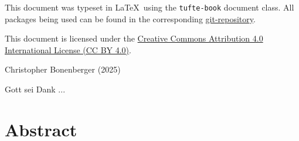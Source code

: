 \maketitle%
\setlength{\parindent}{0pt}%
\thispagestyle{empty}

This document was typeset in \LaTeX~using the \texttt{tufte-book} document class. All packages being used can be found in the corresponding  \href{https://github.com/cmab92/TeXamples/tree/master/books/main.tex}{git-repository}. \\\newline 

This document is licensed under the 
\href{https://creativecommons.org/licenses/by/4.0/}{Creative Commons Attribution 4.0 International License (CC BY 4.0)}. \\\newline 

\vfill
Christopher Bonenberger (2025) \titleofthesis \clearpage
\setlength{\parindent}{0pt}%
\thispagestyle{empty}
\vfill


\thispagestyle{empty}
\setlength{\parindent}{0pt}%
\hfill %
\begin{fullwidth}
		{\centering
			\kitschytwo\LARGE Gott sei Dank ...\par
		}
\end{fullwidth}
\setlength{\parindent}{0pt}%
\cleardoublepage



\section*{Abstract}
\thispagestyle{empty}
\setlength{\parindent}{0pt}%

\cleardoublepage
